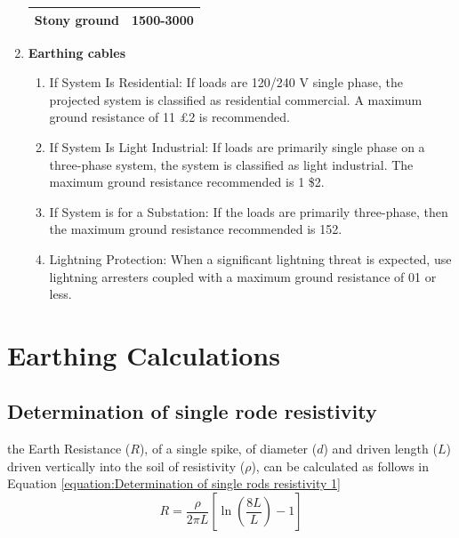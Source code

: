 \documentclass[12pt,fleqn]{book} %
\begin{document}
\begin{enumerate}
\begin{table}[!h]
\begin{tabular}{!{\color[rgb]{0.557,0.667,0.859}\vrule}c!{\color{black}\vrule}c!{\color[rgb]{0.557,0.667,0.859}\vrule}}
\hline
{} \textbf{\textcolor[rgb]{0.322,0,0}{Stony} ground\textcolor[rgb]{0.322,0,0}{}}               & 1500-3000                                                                                                                                                                                                                                                                                                              \\
\hline
\end{tabular}
\end{table}
    \item \textbf{Earthing cables}
    \begin{enumerate}
        \item If System Is Residential: If loads are 120/240 V single phase, the projected system is classified as residential commercial. A maximum ground resistance of 11 £2 is recommended.
        \item If System Is Light Industrial: If loads are primarily single phase on a three-phase system, the system is classified as light industrial. The maximum ground resistance recommended is 1 \$2.
        \item If System is for a Substation: If the loads are primarily three-phase, then the maximum ground resistance recommended is 152.
        \item Lightning Protection: When a significant lightning threat is expected, use lightning arresters coupled with a maximum ground resistance of 01 or less.
    \end{enumerate}
\end{enumerate}
\section{Earthing Calculations}
\subsection{Determination of single rode resistivity}
the Earth Resistance ($R$), of a single spike, of diameter ($d$) and driven length ($L$) driven vertically into the soil of resistivity ($\rho$), can be calculated as follows in Equation \ref{equation:Determination of single rods resistivity 1}
\begin{equation}
R=\frac{\rho}{2\pi L}\left [ \ln\left ( {\frac{8L}{L}} \right ) -1 \right ]
    \label{equation:Determination of single rods resistivity 1}
\end{equation}
\end{document}

